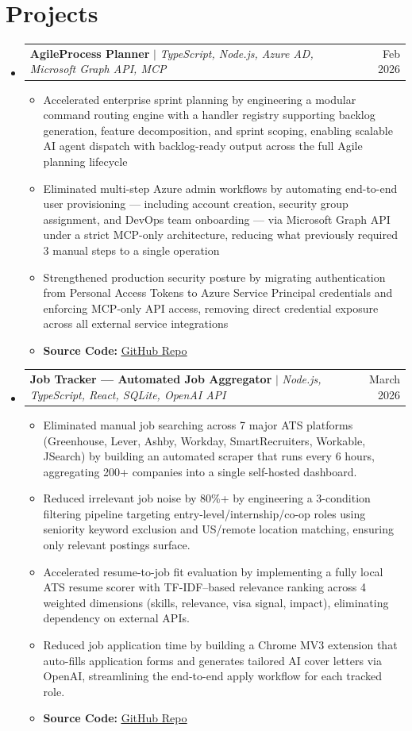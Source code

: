 \documentclass[letterpaper,10pt]{article}
\makeatletter
\newcommand{\resumeItem}[1]{
  \item\small{
    {#1 \vspace{-2pt}}
  }
}
\newcommand{\resumeProjectHeading}[2]{
    \item
    \begin{tabular*}{0.97\textwidth}{l@{\extracolsep{\fill}}r}
      \small#1 & #2 \\
    \end{tabular*}\vspace{-7pt}
}
\newcommand{\resumeSubHeadingListStart}{\begin{itemize}[leftmargin=0.15in, label={}]}
\newcommand{\resumeSubHeadingListEnd}{\end{itemize}}
\newcommand{\resumeItemListStart}{\begin{itemize}}
\newcommand{\resumeItemListEnd}{\end{itemize}\vspace{-5pt}}
\makeatother
\begin{document}

\section{Projects}
    \resumeSubHeadingListStart
      \resumeProjectHeading
          {\textbf{AgileProcess Planner} $|$ \emph{TypeScript, Node.js, Azure AD, Microsoft Graph API, MCP}}{Feb 2026}
          \resumeItemListStart
            \resumeItem{Accelerated enterprise sprint planning by engineering a modular command routing engine with a handler registry supporting backlog generation, feature decomposition, and sprint scoping, enabling scalable AI agent dispatch with backlog-ready output across the full Agile planning lifecycle}
            \resumeItem{Eliminated multi-step Azure admin workflows by automating end-to-end user provisioning — including account creation, security group assignment, and DevOps team onboarding — via Microsoft Graph API under a strict MCP-only architecture, reducing what previously required 3 manual steps to a single operation}
            \resumeItem{Strengthened production security posture by migrating authentication from Personal Access Tokens to Azure Service Principal credentials and enforcing MCP-only API access, removing direct credential exposure across all external service integrations}
            \resumeItem{\textbf{Source Code:} \href{https://github.com/workasaservice/agileprocess-planner}{\underline{GitHub Repo}}}
\resumeItemListEnd
      \resumeProjectHeading
            {\textbf{Job Tracker — Automated Job Aggregator} $|$ \emph{Node.js, TypeScript, React, SQLite, OpenAI API}}{March 2026}
          \resumeItemListStart
            \resumeItem{Eliminated manual job searching across 7 major ATS platforms (Greenhouse, Lever, Ashby, Workday, SmartRecruiters, Workable, JSearch) by building an automated scraper that runs every 6 hours, aggregating 200+ companies into a single self-hosted dashboard.}
            \resumeItem{Reduced irrelevant job noise by 80\%+ by engineering a 3-condition filtering pipeline targeting entry-level/internship/co-op roles using seniority keyword exclusion and US/remote location matching, ensuring only relevant postings surface.}
            \resumeItem{Accelerated resume-to-job fit evaluation by implementing a fully local ATS resume scorer with TF-IDF–based relevance ranking across 4 weighted dimensions (skills, relevance, visa signal, impact), eliminating dependency on external APIs.}
            \resumeItem{Reduced job application time by building a Chrome MV3 extension that auto-fills application forms and generates tailored AI cover letters via OpenAI, streamlining the end-to-end apply workflow for each tracked role.}
            \resumeItem{\textbf{Source Code:} \href{https://github.com/priyabrataunt/job_automation}{\underline{GitHub Repo}}}
          \resumeItemListEnd
    \resumeSubHeadingListEnd
    
\end{document}
